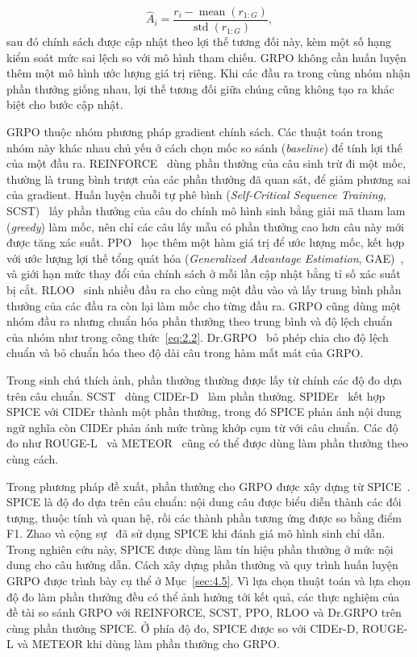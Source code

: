 \begin{equation}
\hat{A}_i = \frac{r_i - \operatorname{mean}(r_{1:G})}{\operatorname{std}(r_{1:G})},
\label{eq:2.2}
\end{equation}
\noindent
sau đó chính sách được cập nhật theo lợi thế tương đối này, kèm một số hạng kiểm soát mức sai lệch so với mô hình tham chiếu. GRPO không cần huấn luyện thêm một mô hình ước lượng giá trị riêng. Khi các đầu ra trong cùng nhóm nhận phần thưởng giống nhau, lợi thế tương đối giữa chúng cũng không tạo ra khác biệt cho bước cập nhật.

GRPO thuộc nhóm phương pháp gradient chính sách. Các thuật toán trong nhóm này khác nhau chủ yếu ở cách chọn mốc so sánh (\emph{baseline}) để tính lợi thế của một đầu ra. REINFORCE~\cite{williams1992} dùng phần thưởng của câu sinh trừ đi một mốc, thường là trung bình trượt của các phần thưởng đã quan sát, để giảm phương sai của gradient. Huấn luyện chuỗi tự phê bình (\emph{Self-Critical Sequence Training}, SCST)~\cite{scst} lấy phần thưởng của câu do chính mô hình sinh bằng giải mã tham lam (\emph{greedy}) làm mốc, nên chỉ các câu lấy mẫu có phần thưởng cao hơn câu này mới được tăng xác suất. PPO~\cite{ppo} học thêm một hàm giá trị để ước lượng mốc, kết hợp với ước lượng lợi thế tổng quát hóa (\emph{Generalized Advantage Estimation}, GAE)~\cite{gae}, và giới hạn mức thay đổi của chính sách ở mỗi lần cập nhật bằng tỉ số xác suất bị cắt. RLOO~\cite{rloo} sinh nhiều đầu ra cho cùng một đầu vào và lấy trung bình phần thưởng của các đầu ra còn lại làm mốc cho từng đầu ra. GRPO cũng dùng một nhóm đầu ra nhưng chuẩn hóa phần thưởng theo trung bình và độ lệch chuẩn của nhóm như trong công thức~\eqref{eq:2.2}. Dr.GRPO~\cite{drgrpo} bỏ phép chia cho độ lệch chuẩn và bỏ chuẩn hóa theo độ dài câu trong hàm mất mát của GRPO.

Trong sinh chú thích ảnh, phần thưởng thường được lấy từ chính các độ đo dựa trên câu chuẩn. SCST~\cite{scst} dùng CIDEr-D~\cite{cider} làm phần thưởng. SPIDEr~\cite{spider} kết hợp SPICE với CIDEr thành một phần thưởng, trong đó SPICE phản ánh nội dung ngữ nghĩa còn CIDEr phản ánh mức trùng khớp cụm từ với câu chuẩn. Các độ đo như ROUGE-L~\cite{rouge} và METEOR~\cite{meteor} cũng có thể được dùng làm phần thưởng theo cùng cách.

Trong phương pháp đề xuất, phần thưởng cho GRPO được xây dựng từ SPICE~\cite{spice}. SPICE là độ đo dựa trên câu chuẩn: nội dung câu được biểu diễn thành các đối tượng, thuộc tính và quan hệ, rồi các thành phần tương ứng được so bằng điểm F1. Zhao và cộng sự~\cite{zhao2021} đã sử dụng SPICE khi đánh giá mô hình sinh chỉ dẫn. Trong nghiên cứu này, SPICE được dùng làm tín hiệu phần thưởng ở mức nội dung cho câu hướng dẫn. Cách xây dựng phần thưởng và quy trình huấn luyện GRPO được trình bày cụ thể ở Mục~\ref{sec:4.5}. Vì lựa chọn thuật toán và lựa chọn độ đo làm phần thưởng đều có thể ảnh hưởng tới kết quả, các thực nghiệm của đề tài so sánh GRPO với REINFORCE, SCST, PPO, RLOO và Dr.GRPO trên cùng phần thưởng SPICE. Ở phía độ đo, SPICE được so với CIDEr-D, ROUGE-L và METEOR khi dùng làm phần thưởng cho GRPO.

